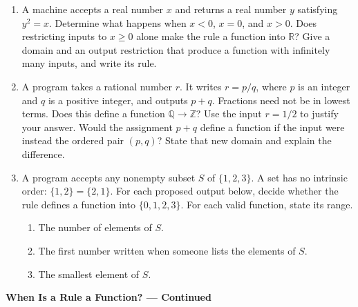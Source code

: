 \documentclass[11pt]{article}
\begin{document}
\begin{enumerate}[leftmargin=*,itemsep=0pt,resume]
  \item A machine accepts a real number $x$ and returns a real number $y$
  satisfying $y^2=x$. Determine what happens when $x<0$, $x=0$, and $x>0$.
  Does restricting inputs to $x\ge0$ alone make the rule a function into
  $\mathbb R$? Give a domain and an output restriction that produce a
  function with infinitely many inputs, and write its rule.

  \item A program takes a rational number $r$. It writes $r=p/q$, where
  $p$ is an integer and $q$ is a positive integer, and outputs $p+q$.
  Fractions need not be in lowest terms. Does this define a function
  $\mathbb Q\to\mathbb Z$? Use the input $r=1/2$ to justify your answer.
  Would the assignment $p+q$ define a function if the input were instead
  the ordered pair $(p,q)$? State that new domain and explain the difference.

  \item A program accepts any nonempty subset $S$ of $\{1,2,3\}$. A set
  has no intrinsic order: $\{1,2\}=\{2,1\}$. For each proposed output below,
  decide whether the rule defines a function into $\{0,1,2,3\}$.
  For each valid function, state its range.
  \begin{enumerate}[label=(\alph*),leftmargin=1.6em,itemsep=0.25em]
    \item The number of elements of $S$.
    \item The first number written when someone lists the elements of $S$.
    \item The smallest element of $S$.
  \end{enumerate}
\end{enumerate}

\newpage
\begin{center}
  {\large\textbf{When Is a Rule a Function? --- Continued}}
\end{center}
\end{document}
